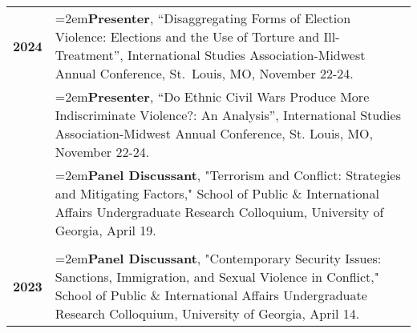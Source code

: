 \documentclass[letterpaper,12pt]{article}
\begin{document}
\begin{xltabular}{\dimexpr\textwidth-0in}{p{.85in}X}
\textbf{2024} & \hangindent=2em\textbf{Presenter}, ``Disaggregating Forms of Election Violence: Elections and the Use of \mbox{Torture} and Ill-Treatment”, International Studies Association-Midwest Annual Conference, \mbox{St. Louis}, MO, November 22-24.\\
                     & \hangindent=2em\textbf{Presenter}, ``Do Ethnic Civil Wars Produce More Indiscriminate Violence?: An \mbox{Analysis}”, International Studies Association-Midwest Annual Conference, St. Louis, MO, \mbox{November} 22-24.\\
                     & \hangindent=2em\textbf{Panel Discussant}, "Terrorism and Conflict: Strategies and Mitigating Factors," School of Public \& International Affairs Undergraduate Research Colloquium, University of Georgia, April 19.\\  \\
\textbf{2023} &  \hangindent=2em\textbf{Panel Discussant}, "Contemporary Security Issues: Sanctions, Immigration, and \mbox{Sexual} \mbox{Violence} in Conflict," School of Public \& International Affairs Undergraduate \mbox{Research} \mbox{Colloquium,} University of Georgia, April 14.\\ 
\end{xltabular}

\end{document}

